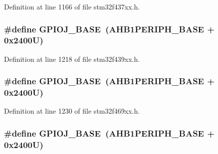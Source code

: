 Definition at line 1166 of file stm32f437xx.\+h.

\subsubsection[{\texorpdfstring{G\+P\+I\+O\+J\+\_\+\+B\+A\+SE}{GPIOJ_BASE}}]{\setlength{\rightskip}{0pt plus 5cm}\#define G\+P\+I\+O\+J\+\_\+\+B\+A\+SE~({\bf A\+H\+B1\+P\+E\+R\+I\+P\+H\+\_\+\+B\+A\+SE} + 0x2400\+U)}\hypertarget{group___peripheral__memory__map_ga73f5a4e42f41acc614ee82c8ebfe0b85}{}\label{group___peripheral__memory__map_ga73f5a4e42f41acc614ee82c8ebfe0b85}


Definition at line 1218 of file stm32f439xx.\+h.

\subsubsection[{\texorpdfstring{G\+P\+I\+O\+J\+\_\+\+B\+A\+SE}{GPIOJ_BASE}}]{\setlength{\rightskip}{0pt plus 5cm}\#define G\+P\+I\+O\+J\+\_\+\+B\+A\+SE~({\bf A\+H\+B1\+P\+E\+R\+I\+P\+H\+\_\+\+B\+A\+SE} + 0x2400\+U)}\hypertarget{group___peripheral__memory__map_ga73f5a4e42f41acc614ee82c8ebfe0b85}{}\label{group___peripheral__memory__map_ga73f5a4e42f41acc614ee82c8ebfe0b85}


Definition at line 1230 of file stm32f469xx.\+h.

\subsubsection[{\texorpdfstring{G\+P\+I\+O\+J\+\_\+\+B\+A\+SE}{GPIOJ_BASE}}]{\setlength{\rightskip}{0pt plus 5cm}\#define G\+P\+I\+O\+J\+\_\+\+B\+A\+SE~({\bf A\+H\+B1\+P\+E\+R\+I\+P\+H\+\_\+\+B\+A\+SE} + 0x2400\+U)}\hypertarget{group___peripheral__memory__map_ga73f5a4e42f41acc614ee82c8ebfe0b85}{}\label{group___peripheral__memory__map_ga73f5a4e42f41acc614ee82c8ebfe0b85}


